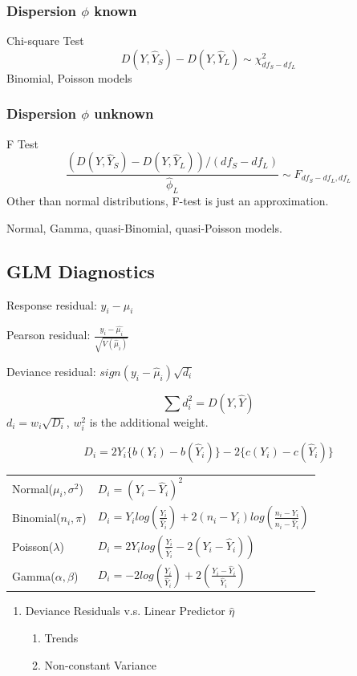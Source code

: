 \documentclass[10pt,landscape, fleqn]{article}
\begin{document}
\begin{multicols}{3}
				\subsubsection{Dispersion $\phi$ known}
					Chi-square Test
					\[ D(Y,\hat{Y}_S) - D(Y, \hat{Y}_L) \sim \chi^2_{df_S-df_L} \]
					Binomial, Poisson models
				\subsubsection{Dispersion $\phi$ unknown}
					F Test
					\[ \frac{(D(Y,\hat{Y}_S) - D(Y, \hat{Y}_L))/(df_S-df_L)}{\hat{\phi}_L} \sim F_{df_S-df_L, df_L} \]
					Other than normal distributions, F-test is just an approximation. \par 
					Normal, Gamma, quasi-Binomial, quasi-Poisson models.
			\subsection{GLM Diagnostics}
				Response residual: $y_i - \hat{\mu_i}$ \par
				Pearson residual: $\frac{y_i-\hat{\mu_i}}{\sqrt{V(\hat{\mu}_i)}}$ \par 
				Deviance residual: $sign(y_i-\hat{\mu}_i)\sqrt{d_i}$ \par 
				\[\sum d_i^2 = D(Y, \hat{Y}) \]
				$ d_i = w_i\sqrt{D_i}$, $w_i^2$ is the additional weight. \par 
				\[D_i = 2Y_i\{b(Y_i)-b(\hat{Y}_i)\} - 2\{c(Y_i)-c(\hat{Y}_i)\}\]
				\begin{tabular}{|l | l|}
					\hline
					Normal($\mu_i, \sigma^2$) & $D_i = (Y_i-\hat{Y}_i)^2$  \\
					Binomial($n_i, \pi$) & $D_i = Y_ilog\left(\frac{Y_i}{\hat{Y}_i}\right)+2(n_i-Y_i)log\left(\frac{n_i-Y_i}{n_i-\hat{Y}_i}\right)$ \\
					Poisson($\lambda$) & $D_i = 2Y_ilog\left(\frac{Y_i}{\hat{Y}_i} - 2(Y_i - \hat{Y}_i)\right)$ \\
					Gamma($\alpha, \beta$) & $D_i = -2log\left(\frac{Y_i}{\hat{Y}_i}\right) + 2 \left(\frac{Y_i-\hat{Y}_i}{\hat{Y}_i}\right)$ \\
					\hline
				\end{tabular}
				\begin{enumerate}
					\item Deviance Residuals v.s. Linear Predictor $\hat{\eta}$
						  \begin{enumerate}
						  	\item Trends
						  	\item Non-constant Variance

\end{enumerate}
\end{enumerate}
\end{multicols}
\end{document}
